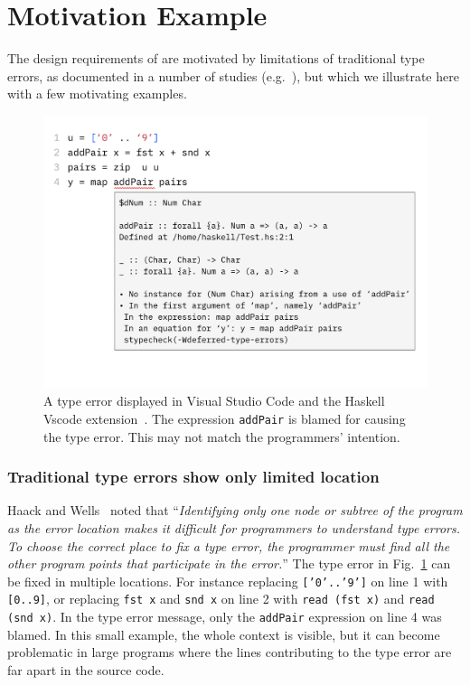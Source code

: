 \section{Motivation Example}

The design requirements of \chameleon{} are motivated by limitations of traditional type errors, as documented in a number of studies (e.g.~\cite{yang_improved_2000, hage_solved_2020}), but which we illustrate here with a few motivating examples. 

\begin{figure}
    \centering
    \includegraphics[width=\linewidth,trim=0mm 35mm 0mm 0mm]{Figures/add-pair-example.pdf}
    \caption{
    A type error displayed in Visual Studio Code\cite{microsoft_visual_nodate} and the Haskell Vscode extension~\cite{haskell_haskell_nodate}.
The expression \texttt{addPair} is blamed for causing the type error. This may not match the programmers' intention. 
    }
    \label{fig:motivation-example}
\end{figure}

\subsubsection{\textbf{Traditional type errors show only limited location}}
Haack and Wells~\cite{haack_type_2004} noted that ``\textit{Identifying only one node or subtree of the program as the error location makes it difficult for programmers to understand type errors. To choose the correct place to fix a type error, the programmer must find all the other program points that participate in the error.}'' The type error in Fig.~\ref{fig:motivation-example} can be fixed in multiple locations. For instance  replacing \texttt{['0'..'9']} on line 1 with \texttt{[0..9]}, or replacing \texttt{fst x} and \texttt{snd x} on line 2 with \texttt {read (fst x)} and \texttt{read (snd  x)}. In the type error message, only the \texttt{addPair} expression on line 4 was blamed.  In this small example, the whole context is visible, but it can become problematic in large programs where the lines contributing to the type error are far apart in the source code.

